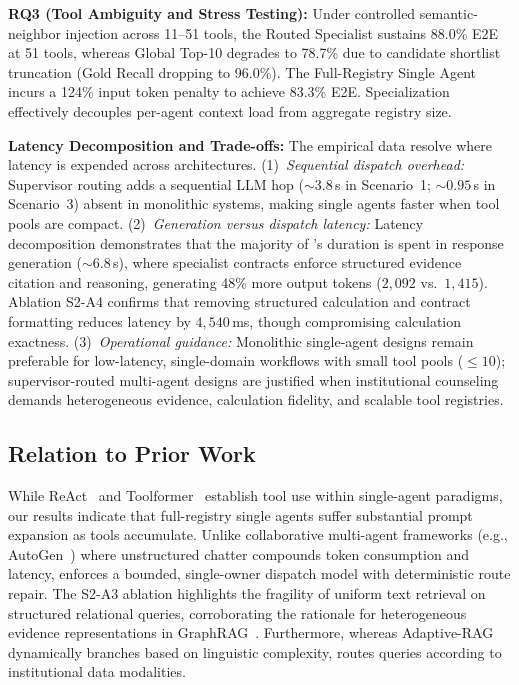 \textbf{RQ3 (Tool Ambiguity and Stress Testing):}
Under controlled semantic-neighbor injection across 11--51 tools, the Routed Specialist sustains 88.0\% E2E at 51 tools, whereas Global Top-10 degrades to 78.7\% due to candidate shortlist truncation (Gold Recall dropping to 96.0\%). The Full-Registry Single Agent incurs a 124\% input token penalty to achieve 83.3\% E2E. Specialization effectively decouples per-agent context load from aggregate registry size.

\textbf{Latency Decomposition and Trade-offs:}
The empirical data resolve where latency is expended across architectures. (1)~\emph{Sequential dispatch overhead:} Supervisor routing adds a sequential LLM hop (${\sim}3.8$\,s in Scenario~1; ${\sim}0.95$\,s in Scenario~3) absent in monolithic systems, making single agents faster when tool pools are compact. (2)~\emph{Generation versus dispatch latency:} Latency decomposition demonstrates that the majority of \system{}'s duration is spent in response generation (${\sim}6.8$\,s), where specialist contracts enforce structured evidence citation and reasoning, generating 48\% more output tokens ($2{,}092$ vs.\ $1{,}415$). Ablation S2-A4 confirms that removing structured calculation and contract formatting reduces latency by $4{,}540$\,ms, though compromising calculation exactness. (3)~\emph{Operational guidance:} Monolithic single-agent designs remain preferable for low-latency, single-domain workflows with small tool pools (${\le}10$); supervisor-routed multi-agent designs are justified when institutional counseling demands heterogeneous evidence, calculation fidelity, and scalable tool registries.

\subsection{Relation to Prior Work}

While ReAct~\cite{yao2023react} and Toolformer~\cite{schick2023toolformer} establish tool use within single-agent paradigms, our results indicate that full-registry single agents suffer substantial prompt expansion as tools accumulate. Unlike collaborative multi-agent frameworks (e.g., AutoGen~\cite{wu2023autogen}) where unstructured chatter compounds token consumption and latency, \system{} enforces a bounded, single-owner dispatch model with deterministic route repair. The S2-A3 ablation highlights the fragility of uniform text retrieval on structured relational queries, corroborating the rationale for heterogeneous evidence representations in GraphRAG~\cite{edge2024graphrag}. Furthermore, whereas Adaptive-RAG~\cite{jeong2024adaptiverag} dynamically branches based on linguistic complexity, \system{} routes queries according to institutional data modalities.

